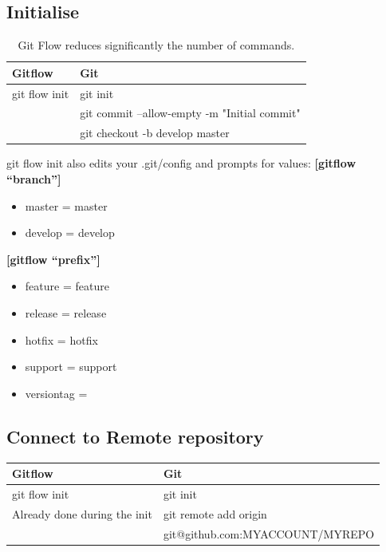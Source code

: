 \documentclass{tufte-handout}
\begin{document}
		
		\subsection{Initialise}
		
		\begin{table}[ht]
			\centering
			\selectfont
			\begin{tabular}{ll}
				\toprule
				Gitflow & Git \\
				\midrule
				git flow init & git init \\
				 & git commit –allow-empty -m "Initial commit" \\
				 & git checkout -b develop master \\
				\bottomrule
			\end{tabular}
			\caption{Git Flow reduces significantly the number of commands.}
			\label{tab:normaltab}
		\end{table}
		\medskip %
		
		\vspace{0.125cm}
		git flow init also edits your .git/config and prompts for values:		
		\vspace{0.05cm}
		\textbf{{[}gitflow ``branch''{]}}
			\begin{itemize}
				\item master = master
				\item develop = develop
			\end{itemize}
				\textbf{{[}gitflow ``prefix''{]}} 
			\begin{itemize}
				\item feature = feature
				\item release = release
				\item hotfix = hotfix
				\item support = support
				\item versiontag = 
			\end{itemize}
	
		\subsection{Connect to Remote repository}
		
		\begin{table}[ht]
			\centering
			\selectfont
			\begin{tabular}{ll}
				\toprule
				Gitflow & Git \\
				\midrule
				git flow init & git init \\
				Already done during the init & git remote add origin \\
				& git@github.com:MYACCOUNT/MYREPO \\
				\bottomrule
			\end{tabular}
			\label{tab:normaltab}
		\end{table}
		\medskip %
		
\end{document}
